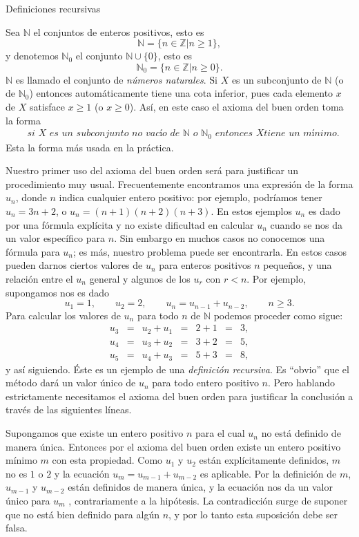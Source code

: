 \begin{section}{Definiciones recursivas}\label{seccion-definiciones-recursivas}

Sea $\mathbb N$ el conjuntos de enteros positivos, esto es
$$
\mathbb N = \{ n \in \mathbb Z | n\ge 1\},
$$
y denotemos $\mathbb N_0$ el conjunto $\mathbb N \cup \{0\}$, esto
es
$$
\mathbb N_0 = \{ n \in \mathbb Z | n\ge 0\}.
$$
$\mathbb{N}$  es llamado el conjunto de  \textit{números naturales}. Si $X$ es un subconjunto de $\mathbb N$ (o de $\mathbb N_0$)  entonces automáticamente tiene una cota inferior, pues cada elemento $x$ de $X$ satisface $x\ge 1$ (o $x\ge 0$). As{í}, en este caso el axioma del buen orden toma la forma
$$
\begin{aligned}
&\textit{si $X$ es un subconjunto no vacío de $\mathbb N$ o $\mathbb N_0$ entonces $X$
 tiene un mínimo.}
\end{aligned}
$$
Esta la forma más usada en la práctica.

Nuestro primer uso del axioma del buen orden será para justificar un procedimiento muy usual. Frecuentemente encontramos una expresión de la forma $u_n$, donde $n$ indica cualquier entero positivo: por ejemplo, podríamos tener $u_n=3n+2$, o $u_n = (n+1)(n+2)(n+3)$. En estos ejemplos $u_n$ es dado por una fórmula explícita y no existe dificultad en calcular $u_n$ cuando se nos da un valor específico para $n$. Sin embargo en muchos casos no conocemos una fórmula para $u_n$; es más, nuestro problema puede ser encontrarla. En estos casos pueden darnos ciertos valores de $u_n$ para enteros positivos $n$ peque\~nos, y una relación entre el $u_n$ general y algunos de los $u_r$ con $r<n$. Por ejemplo, supongamos nos es dado 
$$ 
u_1=1, \qquad u_2=2, \qquad u_n =u_{n-1} +u_{n-2}, \qquad n\ge 3.
$$
Para calcular los valores de $u_n$ para todo $n$ de $\mathbb N$ podemos proceder como sigue:
$$
\begin{matrix}
u_3 & = & u_2 + u_1 & = & 2+1 &=& 3, \\
u_4 & = & u_3 + u_2 & = & 3+2 &=& 5, \\
u_5 & = & u_4 + u_3 & = & 5+3 &=& 8,
\end{matrix}
$$
y así siguiendo.  Éste es un ejemplo de una \textit{definición recursiva}. Es ``obvio'' que el método dará un valor único de $u_n$ para todo entero positivo $n$. Pero hablando estrictamente necesitamos el axioma del buen orden para justificar la conclusión a través de las siguientes líneas.

Supongamos que existe un entero positivo $n$ para el cual $u_n$ no está definido de manera única. Entonces por el axioma del buen orden existe un entero positivo mínimo $m$ con esta propiedad. Como $u_1$ y $u_2$ están explícitamente definidos, $m$ no es $1$ o $2$ y la ecuación $u_m =u_{m-1} +u_{m-2}$ es aplicable. Por la definición de $m$, $u_{m-1}$ y $u_{m-2}$ están definidos de manera única, y la ecuación nos da un valor único para $u_m$ , contrariamente a la hipótesis. La contradicción surge de suponer que no está bien definido para algún $n$, y por lo tanto esta suposición debe ser falsa.


\end{section}
